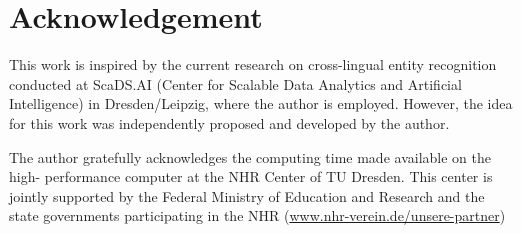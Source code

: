 \documentclass[
  paper = a4,
  BCOR=5mm,       %
  ngerman, english,  %
  twoside,
  numbers=noenddot,
  parskip  = half,   %
  cdgeometry = symmetric,
  cd = barcolor,
  chapterpage  = false,
  cdmath = false,
  slantedgreek=standard,
  captions=tableheading
]{tudscrbook}
\begin{document}
\frontmatter
{}         %

\tableofcontents


\mainmatter  %






{
  \small %
  \printbibliography
  \normalsize %
}

\listoffigures
\listoftables

\appendix              %



\backmatter
\chapter{Acknowledgement}
This work is inspired by the current research on cross-lingual
entity recognition conducted at ScaDS.AI (Center for Scalable Data Analytics
and Artificial Intelligence) in Dresden/Leipzig, where the author is employed.
However, the idea for this work was independently proposed and developed
by the author.

The author gratefully acknowledges the computing time made available on the high-
performance computer at the NHR Center of TU Dresden. This center is jointly supported
by the Federal Ministry of Education and Research and the state governments participating in
the NHR (\url{www.nhr-verein.de/unsere-partner})
\end{document}
